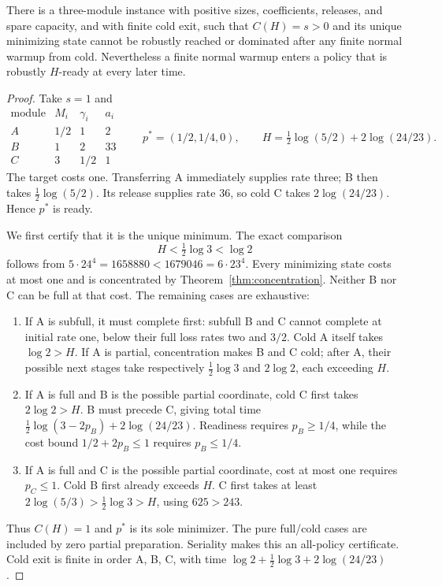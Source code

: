 \begin{theorem}
\label{thm:startup-separation}
There is a three-module instance with positive sizes, coefficients,
releases, and spare capacity, and with finite cold exit, such that
$C(H)=s>0$ and its unique minimizing state cannot be robustly reached or
dominated after any finite normal warmup from cold. Nevertheless a finite normal
warmup enters a policy that is robustly $H$-ready at every later time.
\end{theorem}

\begin{proof}
Take $s=1$ and
\[
\begin{array}{c|ccc}
 \text{module}&M_i&\gamma_i&a_i\\ \hline
 A&1/2&1&2\\
 B&1&2&33\\
 C&3&1/2&1
\end{array}
\qquad
 p^*=(1/2,1/4,0),\qquad
 H=\tfrac12\log(5/2)+2\log(24/23).
\]
The target costs one. Transferring A immediately supplies rate three;
B then takes $\tfrac12\log(5/2)$. Its release supplies rate 36, so cold C
takes $2\log(24/23)$. Hence $p^*$ is ready.

We first certify that it is the unique minimum. The exact comparison
\begin{equation}
 H<\tfrac12\log3<\log2
 \label{eq:startup-deadline-comparison}
\end{equation}
follows from $5\cdot24^4=1658880<1679046=6\cdot23^4$.
Every minimizing state costs at most one and is concentrated by
Theorem~\ref{thm:concentration}. Neither B nor C can be full at that cost.
The remaining cases are exhaustive:
\begin{enumerate}
\item If A is subfull, it must complete first: subfull B and C cannot
complete at initial rate one, below their full loss rates two and $3/2$.
Cold A itself takes $\log2>H$. If A is partial, concentration makes B and C
cold; after A, their possible next stages take respectively
$\tfrac12\log3$ and $2\log2$, each exceeding $H$.
\item If A is full and B is the possible partial coordinate, cold C first
takes $2\log2>H$. B must precede C, giving total time
$\tfrac12\log(3-2p_B)+2\log(24/23)$. Readiness requires $p_B\geq1/4$,
while the cost bound $1/2+2p_B\leq1$ requires $p_B\leq1/4$.
\item If A is full and C is the possible partial coordinate, cost at most
one requires $p_C\leq1$. Cold B first already exceeds $H$. C first takes
at least $2\log(5/3)>\tfrac12\log3>H$, using $625>243$.
\end{enumerate}
Thus $C(H)=1$ and $p^*$ is its sole minimizer. The pure full/cold cases are
included by zero partial preparation. Seriality makes this an all-policy
certificate. Cold exit is finite in order A, B, C, with time
$\log2+\tfrac12\log3+2\log(24/23)$.


\end{proof}
